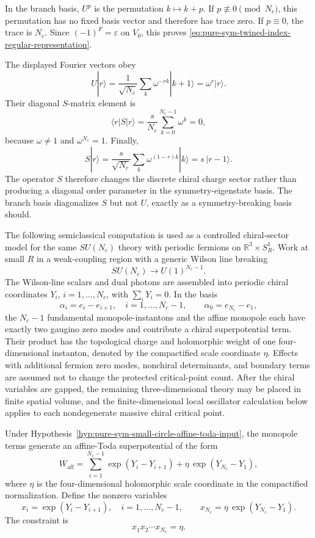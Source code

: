 In the branch basis, \(U^p\) is the permutation \(k\mapsto k+p\).  If
\(p\not\equiv0\pmod{N_c}\), this permutation has no fixed basis vector and
therefore has trace zero.  If \(p\equiv0\), the trace is \(N_c\).  Since
\((-1)^F=\varepsilon\) on \(V_0\), this proves
\eqref{eq:pure-sym-twined-index-regular-representation}.

The displayed Fourier vectors obey
\[
  U|r\rangle
  =
  \frac{1}{\sqrt{N_c}}
  \sum_k \omega^{-rk}|k+1\rangle
  =
  \omega^r|r\rangle .
\]
Their diagonal \(S\)-matrix element is
\[
  \langle r|S|r\rangle
  =
  \frac{s}{N_c}\sum_{k=0}^{N_c-1}\omega^k
  =
  0 ,
\]
because \(\omega\neq1\) and \(\omega^{N_c}=1\).  Finally,
\[
  S|r\rangle
  =
  \frac{s}{\sqrt{N_c}}
  \sum_k \omega^{(1-r)k}|k\rangle
  =
  s\,|r-1\rangle .
\]
The operator \(S\) therefore changes the discrete chiral charge sector
rather than producing a diagonal order parameter in the symmetry-eigenstate
basis.  The branch basis diagonalizes \(S\) but not \(U\), exactly as a
symmetry-breaking basis should.

\begin{hypothesis}
\label{hyp:pure-sym-small-circle-affine-toda-input}
The following semiclassical computation is used as a controlled chiral-sector
model for the same \(SU(N_c)\) theory with periodic fermions on
\(\mathbb R^3\times S^1_R\).  Work at small \(R\) in a weak-coupling region
with a generic Wilson line breaking
\[
  SU(N_c)\longrightarrow U(1)^{N_c-1}.
\]
The Wilson-line scalars and dual photons are assembled into periodic chiral
coordinates \(Y_i\), \(i=1,\ldots,N_c\), with
\(\sum_iY_i=0\).  In the basis
\[
  \alpha_i=e_i-e_{i+1},\quad i=1,\ldots,N_c-1,
  \qquad
  \alpha_0=e_{N_c}-e_1,
\]
the \(N_c-1\) fundamental monopole-instantons and the affine monopole each
have exactly two gaugino zero modes and contribute a chiral superpotential
term.  Their product has the topological charge and holomorphic weight of
one four-dimensional instanton, denoted by the compactified scale coordinate
\(\eta\).  Effects with additional fermion zero modes, nonchiral
determinants, and boundary terms are assumed not to change the protected
critical-point count.  After the chiral variables are gapped, the remaining
three-dimensional theory may be placed in finite spatial volume, and the
finite-dimensional local oscillator calculation below applies to each
nondegenerate massive chiral critical point.
\end{hypothesis}

Under Hypothesis~\ref{hyp:pure-sym-small-circle-affine-toda-input}, the
monopole terms generate an affine-Toda superpotential of the form
\[
  W_{\mathrm{aff}}
  =
  \sum_{i=1}^{N_c-1}\exp(Y_i-Y_{i+1})
  +
  \eta\,\exp(Y_{N_c}-Y_1),
\]
where \(\eta\) is the four-dimensional holomorphic scale coordinate in the
compactified normalization.  Define the nonzero variables
\[
  x_i=\exp(Y_i-Y_{i+1}),\quad i=1,\ldots,N_c-1,
  \qquad
  x_{N_c}=\eta\,\exp(Y_{N_c}-Y_1).
\]
The constraint is
\[
  x_1x_2\cdots x_{N_c}=\eta .
\]

